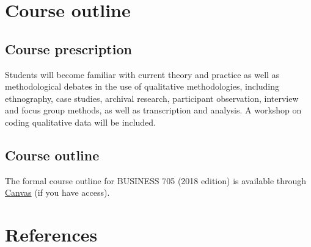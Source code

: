 \documentclass[]{book}
\theoremstyle{definition}
\theoremstyle{definition}
\theoremstyle{definition}
\theoremstyle{remark}
\begin{document}
\hypertarget{course-outline}{%
\chapter{Course outline}\label{course-outline}}

\hypertarget{course-prescription}{%
\section{Course prescription}\label{course-prescription}}

Students will become familiar with current theory and practice as well
as methodological debates in the use of qualitative methodologies,
including ethnography, case studies, archival research, participant
observation, interview and focus group methods, as well as transcription
and analysis. A workshop on coding qualitative data will be included.

\hypertarget{course-outline-1}{%
\section{Course outline}\label{course-outline-1}}

The formal course outline for BUSINESS 705 (2018 edition) is available
through
\href{https://canvas.auckland.ac.nz/courses/29734/files/2224532/download}{Canvas}
(if you have access).

\hypertarget{references}{%
\chapter{References}\label{references}}

\printbibliography
\end{document}
